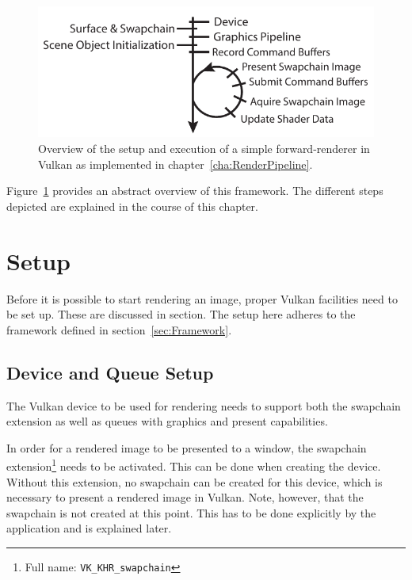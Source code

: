   \begin{figure}
    \includegraphics{Main/Images/RenderSetupAndLoopSimple}
    \centering
    \caption{Overview of the setup and execution of a simple forward-renderer in Vulkan as implemented in chapter~\ref{cha:RenderPipeline}.}
    \label{fig:RenderSetupAndLoopSimple}
  \end{figure}

  Figure~\ref{fig:RenderSetupAndLoopSimple} provides an abstract overview of this framework.
  The different steps depicted are explained in the course of this chapter.


  \section{Setup}
  \label{sec:RenderingSetup}
    Before it is possible to start rendering an image, proper Vulkan facilities need to be set up.
    These are discussed in section.
    The setup here adheres to the framework defined in section~\ref{sec:Framework}.

    \subsection{Device and Queue Setup}
      The Vulkan device to be used for rendering needs to support both the swapchain extension as well as queues with graphics and present capabilities.

      In order for a rendered image to be presented to a window, the swapchain extension\footnote{Full name: \lstinline{VK_KHR_swapchain}} needs to be activated.
      This can be done when creating the device.
      Without this extension, no swapchain can be created for this device, which is necessary to present a rendered image in Vulkan.
      Note, however, that the swapchain is not created at this point.
      This has to be done explicitly by the application and is explained later.

